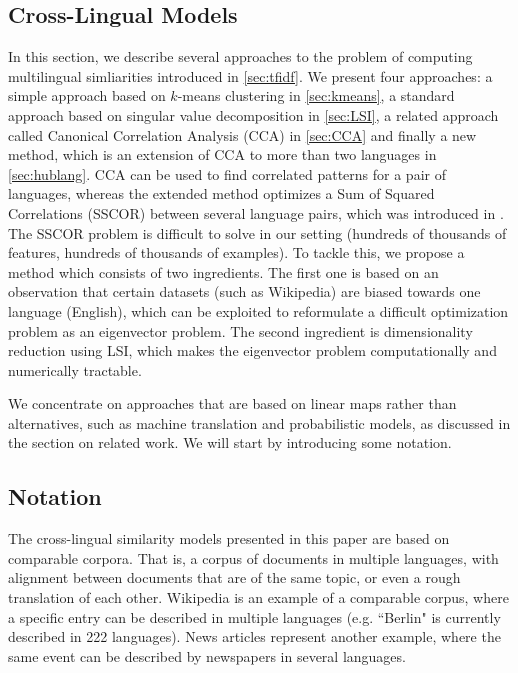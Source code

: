 \documentclass[twoside,11pt]{article}
\begin{document}
\subsection{Cross-Lingual Models}\label{sec:models}
In this section, we describe several approaches to the problem of computing multilingual simliarities introduced in \ref{sec:tfidf}. We present four approaches:
a simple approach based on $k$-means clustering in \ref{sec:kmeans}, a standard approach based on singular value decomposition in \ref{sec:LSI}, a related
approach called Canonical Correlation Analysis (CCA) in \ref{sec:CCA} and finally a new method, which is an extension of CCA to more than two languages in \ref{sec:hublang}.
%
CCA can be used to find correlated patterns for a pair of languages, whereas the extended method optimizes a
Sum of Squared Correlations (SSCOR) between several language pairs, which was introduced in \cite{Kettenring}. The SSCOR problem is difficult to solve in our setting (hundreds of thousands of features, hundreds of thousands of examples). To tackle this, we propose a method which consists of two ingredients.
 The first one is based on an observation that certain datasets (such as Wikipedia) are biased towards one language (English), which can be exploited
 to reformulate a difficult optimization problem as an eigenvector problem. The second ingredient is dimensionality reduction using LSI, which
 makes the eigenvector problem computationally and numerically tractable.

We concentrate on approaches that are based on linear maps rather than alternatives, such as machine translation and probabilistic models, as discussed in the section on related work.
We will start by introducing some notation.

\subsection{Notation}

The cross-lingual similarity models presented in this paper are based on comparable corpora. That is, a corpus of documents in multiple languages, with alignment between documents that are of the same topic, or even a rough translation of each other. Wikipedia is an example of a comparable corpus, where a specific entry can be described in multiple languages (e.g. ``Berlin" is currently described in 222 languages). News articles represent another example, where the same event can be described by newspapers in several languages.
\end{document}
